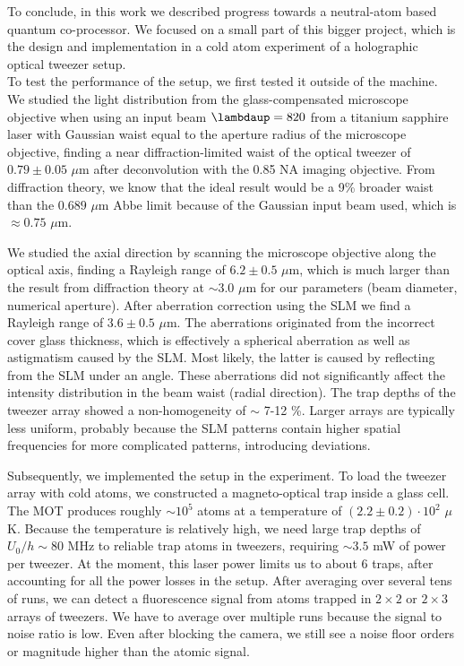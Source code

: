 To conclude, in this work we described progress towards a neutral-atom based quantum co-processor. 
We focused on a small part of this bigger project, which is the design and implementation in a cold atom experiment of a holographic optical tweezer setup. \\

\noindent To test the performance of the setup, we first tested it outside of the machine.
We studied the light distribution from the glass-compensated microscope objective when using an input beam $\lambdaup = 820$ from a titanium sapphire laser with Gaussian waist equal to the aperture radius of the microscope objective, finding a near diffraction-limited waist of the optical tweezer of $0.79 \pm 0.05$ $\mu$m after deconvolution with the 0.85 NA imaging objective. 
From diffraction theory, we know that the ideal result would be a 9\% broader waist than the $0.689$ $\mu$m Abbe limit because of the Gaussian input beam used, which is $\approx 0.75$ $\mu$m.

We studied the axial direction by scanning the microscope objective along the optical axis, finding a Rayleigh range of $6.2\pm0.5$ $\mu$m, which is much larger than the result from diffraction theory at $\sim 3.0$ $\mu$m for our parameters (beam diameter, numerical aperture). 
After aberration correction using the SLM we find a Rayleigh range of $3.6 \pm 0.5$ $\mu$m.
The aberrations originated from the incorrect cover glass thickness, which is effectively a spherical aberration as well as astigmatism caused by the SLM.
Most likely, the latter is caused by reflecting from the SLM under an angle.
These aberrations did not significantly affect the intensity distribution in the beam waist (radial direction).
The trap depths of the tweezer array showed a non-homogeneity of $\sim$ 7-12 \%.
Larger arrays are typically less uniform, probably because the SLM patterns contain higher spatial frequencies for more complicated patterns, introducing deviations. 

Subsequently, we implemented the setup in the experiment.
To load the tweezer array with cold atoms, we constructed a magneto-optical trap inside a glass cell. 
The MOT produces roughly $\sim10^5$ atoms at a temperature of $(2.2 \pm 0.2) \cdot 10^2$ $\mu$K.
Because the temperature is relatively high, we need large trap depths of $U_0/h \sim 80$ MHz to reliable trap atoms in tweezers, requiring $\sim 3.5$ mW of power per tweezer.
At the moment, this laser power limits us to about 6 traps, after accounting for all the power losses in the setup. 
After averaging over several tens of runs, we can detect a fluorescence signal from atoms trapped in $2\times 2$ or $2\times 3$ arrays of tweezers. 
We have to average over multiple runs because the signal to noise ratio is low.
Even after blocking the camera, we still see a noise floor orders or magnitude higher than the atomic signal. \\


